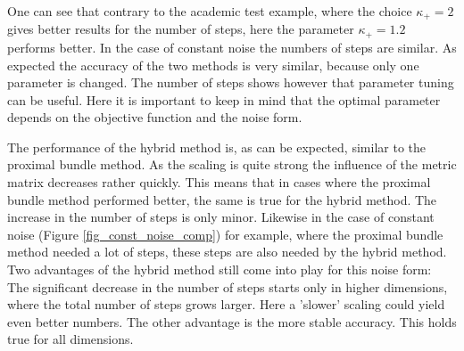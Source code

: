 One can see that contrary to the academic test example, where the choice \(\kappa_+ = 2\) gives better results for the number of steps, here the parameter \(\kappa_+=1.2\) performs better.
In the case of constant noise the numbers of steps are similar.
As  expected the accuracy of the two methods is very similar, because only one parameter is changed. The number of steps shows however that parameter tuning can be useful. Here it is important to keep in mind that the optimal parameter depends on the objective function and the noise form.

The performance of the hybrid method is, as can be expected, similar to the proximal bundle method. As the scaling is quite strong the influence of the metric matrix decreases rather quickly.
This means that in cases where the proximal bundle method performed better, the same is true for the hybrid method. The increase in the number of steps is only minor. Likewise in the case of constant noise (Figure \ref{fig_const_noise_comp}) for example, where the proximal bundle method needed a lot of steps, these steps are also needed by the hybrid method. Two advantages of the hybrid method still come into play for this noise form: The significant decrease in the number of steps starts only in higher dimensions, where the total number of steps grows larger. Here a 'slower' scaling could yield even better numbers.
The other advantage is the more stable accuracy. This holds true for all dimensions.
%
%
%
